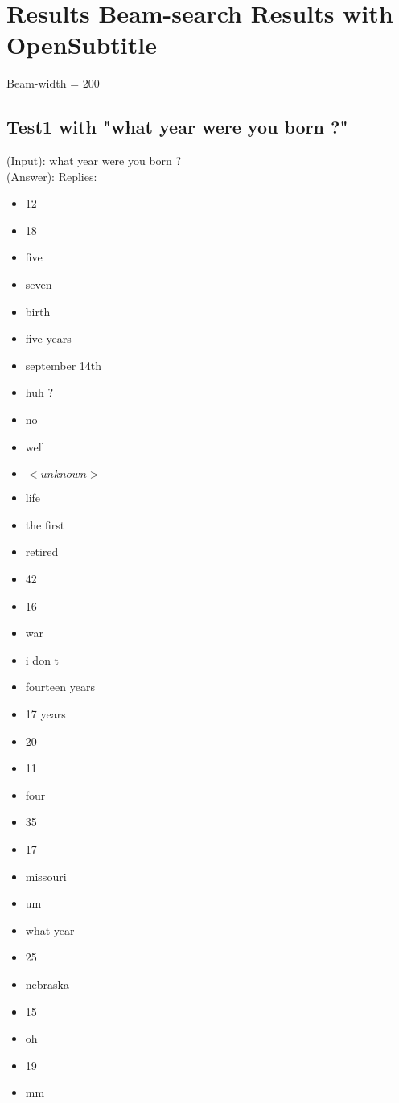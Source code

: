 \chapter{Results Beam-search Results with OpenSubtitle}
\label{apendix:results:Beam-search-200:OpenSubtitle}
Beam-width = 200\\
\section{Test1 with "what year were you born ?"}
\label{apendix:result1:Beam-search-200:OpenSubtitle}
(Input): what year were you born ?\\
(Answer): Replies:
\begin{multicols}{2}
	\begin{itemize}
		\item 12
		\item 18
		\item five
		\item seven
		\item birth
		\item five years
		\item september 14th
		\item huh ?
		\item no
		\item well
		\item $<unknown>$
		\item life
		\item the first
		\item retired
		\item 42
		\item 16
		\item war
		\item i don t
		\item fourteen years
		\item 17 years
		\item 20
		\item 11
		\item four
		\item 35
		\item 17
		\item missouri
		\item um
		\item what year
		\item 25
		\item nebraska
		\item 15
		\item oh
		\item 19
		\item mm

\end{itemize}
\end{multicols}
